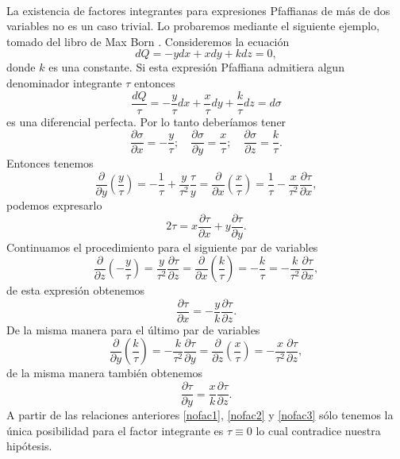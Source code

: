 \documentclass{article}
\theoremstyle{definition} \newtheorem{defi}{Definici\'on}
\theoremstyle{definition} \newtheorem{teo}{Teorema}
\theoremstyle{definition} \newtheorem{cor}{Corolario}
\begin{document}
\paragraph{}
La existencia de factores integrantes para expresiones Pfaffianas de m\'as de dos variables no es un caso trivial. Lo probaremos mediante el siguiente ejemplo, tomado del libro de Max Born \cite{MB}. Consideremos la ecuaci\'on
\begin{equation}
dQ=-ydx+xdy+kdz=0,
\end{equation}
donde $k$ es una constante. Si esta expresi\'on Pfaffiana admitiera algun denominador integrante $\tau$ entonces
\begin{equation}
\frac{dQ}{\tau}=-\frac{y}{\tau}dx+\frac{x}{\tau}dy+\frac{k}{\tau}dz=d\sigma
\end{equation}
es una diferencial perfecta. Por lo tanto deber\'iamos tener
\begin{equation}
\frac{\partial \sigma}{\partial x}=-\frac{y}{\tau};\quad\frac{\partial \sigma}{\partial y}=\frac{x}{\tau};\quad \frac{\partial \sigma}{\partial z}=\frac{k}{\tau}.
\end{equation}
Entonces tenemos
\begin{equation}
\frac{\partial}{\partial y}\left(\frac{y}{\tau}\right)=-\frac{1}{\tau}+\frac{y}{\tau^2}\frac{\tau}{y}=\frac{\partial}{\partial x}\left(\frac{x}{\tau}\right)=\frac{1}{\tau}-\frac{x}{\tau^2}\frac{\partial \tau}{\partial x},
\end{equation}
podemos expresarlo
\begin{equation}\label{nofac1}
2\tau=x\frac{\partial \tau}{\partial x}+y\frac{\partial \tau}{\partial y}.
\end{equation}
Continuamos el procedimiento para el siguiente par de variables
\begin{equation}
\frac{\partial}{\partial z}\left(-\frac{y}{\tau}\right)=\frac{y}{\tau^2}\frac{\partial \tau}{\partial z}=\frac{\partial}{\partial x}\left(\frac{k}{\tau}\right)=-\frac{k}{\tau}=-\frac{k}{\tau^2}\frac{\partial \tau}{\partial x},
\end{equation}
de esta expresi\'on obtenemos
\begin{equation}\label{nofac2}
\frac{\partial \tau}{\partial x}=-\frac{y}{k}\frac{\partial \tau}{\partial z}.
\end{equation}
De la misma manera para el \'ultimo par de variables
\begin{equation}
\frac{\partial}{\partial y}\left(\frac{k}{\tau}\right)=-\frac{k}{\tau^2}\frac{\partial \tau}{\partial y}=\frac{\partial}{\partial z}\left(\frac{x}{\tau}\right)=-\frac{x}{\tau^2}\frac{\partial \tau}{\partial z},
\end{equation}
de la misma manera tambi\'en obtenemos
\begin{equation}\label{nofac3}
\frac{\partial \tau}{\partial y}=\frac{x}{k}\frac{\partial \tau}{\partial z}.
\end{equation}
A partir de las relaciones anteriores \eqref{nofac1}, \eqref{nofac2} y \eqref{nofac3} s\'olo tenemos la \'unica posibilidad para el factor integrante es $\tau \equiv 0$ lo cual contradice nuestra hip\'otesis.
\end{document}
